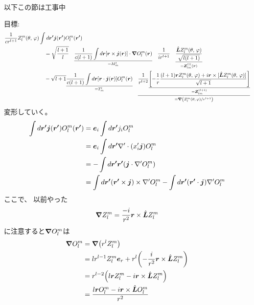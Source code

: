 \documentclass[../../master.tex]{subfiles}
\begin{document}
以下この節は工事中

\clearpage

目標:
\begin{align}
    \frac{1}{cr^{l+1}} Z_l^m(\theta,\,\varphi) &\int d\vb*{r'} \vb*{j}(\vb*{r'}) O_l^{m}(\vb*{r'})\notag\\
    &\quad=\sqrt{\frac{l+1}{l}}\quad\underset{=M_m^l}{\underline{\frac{1}{c(l+1)}\int d\vb*{r}[\vb*{r}\times \vb*{j}(\vb*{r})]\cdot \grad O_l^m(\vb*{r})}}
    \quad\frac{1}{ir^{l+1}}\quad\underset{=\vb*{Z}_{lm}^{(l)}(\vb*{r})}{\underline{\frac{\hat{\vb*{L}}Z_l^m(\theta,\,\varphi)}{\sqrt{l(l+1)}}}}\notag\\
    &\quad-\sqrt{l+1}\underset{=T_m^l}{\underline{\frac{1}{c(l+1)}\int d\vb*{r}[\vb*{r}\cdot \vb*{j}(\vb*{r})] O_l^m(\vb*{r})}}
    \quad\underset{=\grad(Z_l^m(\theta,\,\varphi)/r^{l+1})}{\underline{\frac{1}{r^{l+2}}\underset{=\vb*{Z}_{lm}^{(l+1)}}{\underline{\qty[-\frac{1}{r}\frac{(l+1)\vb*{r}Z_l^m(\theta,\,\varphi)+i\vb*{r}\times [\hat{\vb*{L}}Z_l^m(\theta,\,\varphi)]}{\sqrt{l+1}}]}}}}
\end{align}
変形していく。
\begin{equation}\begin{aligned}[b]
    \int d\vb*{r'} \vb*{j}(\vb*{r'}) O_l^{m}(\vb*{r'})
    &= \vb*{e}_i \int d\vb*{r'} j_i O_l^{m}\\
    &= \vb*{e}_i \int d\vb*{r'} \nabla'\cdot(x_i' \vb*{j}) O_l^m\\
    &= -\int d\vb*{r'} \vb*{r'} (\vb*{j}\cdot \nabla' O_l^m)\\
    &= \int d\vb*{r'} (\vb*{r'}\times\vb*{j})\times \nabla' O_l^m - \int d\vb*{r'} (\vb*{r'}\cdot\vb*{j})\nabla'O_l^m
\end{aligned}\end{equation}
ここで、
以前やった
\begin{equation}
    \grad Z_l^m = \frac{-i}{r^2}\vb*{r}\times \hat{\vb*{L}}Z_l^m
\end{equation}
に注意すると\(\grad O_l^m\)は
\begin{equation}\begin{aligned}[b]
    \grad O_l^m
    &= \grad(r^l Z_l^m)\\
    &= lr^{l-1}Z_l^m \vb*{e}_r +r^l\qty(-\frac{i}{r^2}\vb*{r}\times \hat{\vb*{L}}Z_l^m)\\
    &= r^{l-2}\qty(l\vb*{r}Z_l^m-i\vb*{r}\times\hat{\vb*{L}}Z_l^m)\\
    &=\frac{l\vb*{r}O_l^m-i\vb*{r}\times \hat{\vb*{L}}O_l^m}{r^2}
\end{aligned}\end{equation}
\end{document}

